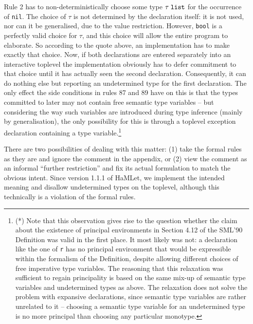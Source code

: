 \documentclass[twoside,titlepage]{article}
\begin{document}
\begin{appendix}
Rule 2 has to non-deterministically choose some type $\tau\;{\tt list}$ for the occurrence of {\tt nil}. The choice of $\tau$ is not determined by the declaration itself: it is not used, nor can it be generalised, due to the value restriction. However, {\tt bool} is a perfectly valid choice for $\tau$, and this choice will allow the entire program to elaborate. So according to the quote above, an implementation has to make exactly that choice. Now, if both declarations are entered separately into an interactive toplevel the implementation obviously has to defer commitment to that choice until it has actually seen the second declaration. Consequently, it can do nothing else but reporting an undetermined type for the first declaration. The only effect the side conditions in rules 87 and 89 have on this is that the types committed to later may not contain free semantic type variables -- but considering the way such variables are introduced during type inference (mainly by generalisation), the only possibility for this is through a toplevel exception declaration containing a type variable.\footnote{(*) Note that this observation gives rise to the question whether the claim about the existence of principal environments in Section 4.12 of the SML'90 Definition \cite{definition90} was valid in the first place. It most likely was not: a declaration like the one of {\tt r} has no principal environment that would be expressible within the formalism of the Definition, despite allowing different choices of free imperative type variables. The reasoning that this relaxation was sufficient to regain principality is based on the same mix-up of semantic type variables and undetermined types as above. The relaxation does not solve the problem with expansive declarations, since semantic type variables are rather unrelated to it -- choosing a semantic type variable for an undetermined type is no more principal than choosing any particular monotype.}

There are two possibilities of dealing with this matter: (1) take the formal rules as they are and ignore the comment in the appendix, or (2) view the comment as an informal ``further restriction'' and fix its actual formulation to match the obvious intent.
Since version 1.1.1 of HaMLet, we implement the intended meaning and disallow undetermined types on the toplevel, although this technically is a violation of the formal rules.



\end{appendix}
\end{document}
